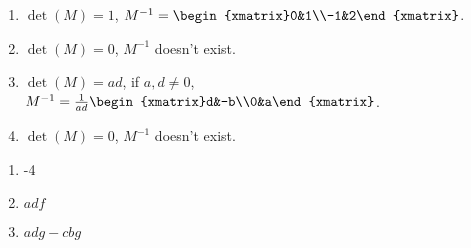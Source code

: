 \begin{exercise}{7}
  \begin{enumerate}
    \item $\det(M) = 1$, $M^{-1} = \begin{xmatrix}0&1\\-1&2\end{xmatrix}$.
    \item $\det(M) = 0$, $M^{-1}$ doesn't exist.
    \item $\det(M) = ad$, if $a, d \neq 0$, $M^{-1} = \frac{1}{ad}\begin{xmatrix}d&-b\\0&a\end{xmatrix}$.
    \item $\det(M) = 0$, $M^{-1}$ doesn't exist.
  \end{enumerate}
\end{exercise}

\begin{exercise}{8}
  \begin{enumerate}
    \item -4
    \item $adf$
    \item $adg - cbg$
  \end{enumerate}
\end{exercise}

